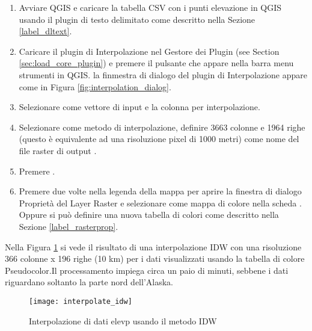 \begin{enumerate}
  \item Avviare QGIS e caricare la  tabella CSV con i punti elevazione in QGIS usando il plugin di testo delimitato come descritto nella Sezione \ref{label_dltext}.
  \item Caricare il plugin di Interpolazione nel Gestore dei Plugin (see Section 
  \ref{sec:load_core_plugin}) e premere il pulsante  che appare nella barra menu strumenti in QGIS. la finmestra di dialogo del plugin di Interpolazione appare come in Figura \ref{fig:interpolation_dialog}.
  \item Selezionare  come vettore di input e la colonna  per interpolazione.
  \item Selezionare  come metodo di interpolazione, definire 
  3663 colonne e 1964 righe (questo è equivalente ad una risoluzione pixel di 1000 metri) come nome del file raster di output .
  \item Premere .
  \item Premere due volte  nella legenda della mappa per aprire la finestra di dialogo Proprietà del Layer Raster e selezionare  come mappa di colore nella scheda . Oppure 
  si può definire una nuova tabella di colori come descritto nella Sezione \ref{label_rasterprop}.
\end{enumerate}

Nella Figura \ref{fig:interpolation_idw} si vede il risultato di una interpolazione IDW con una risoluzione 366 colonne x 196 righe (10 km) per i dati  visualizzati usando la tabella di colore Pseudocolor.Il processamento impiega circa un paio di minuti, sebbene i dati riguardano soltanto la parte nord dell'Alaska.

\begin{figure}[ht]
   \begin{center}
   \caption{Interpolazione di dati elevp usando il metodo IDW \nixcaption}\label{fig:interpolation_idw}\smallskip
   \texttt{[image: interpolate\_idw]}
\end{center}  
\end{figure}

\newpage



